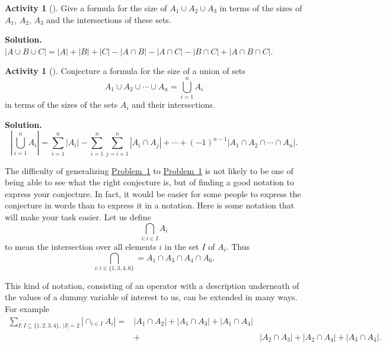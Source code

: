 \documentclass[10pt,]{book}
\theoremstyle{plain}
\theoremstyle{definition}
\newtheorem{activity}[project]{Activity}
\numberwithin{equation}{chapter}
\newcommand{\amp}{&}
\begin{document}
\begin{activity}[]\label{threesetintersection}
Give a formula for the size of \(A_1\cup A_2\cup A_3\) in terms of the sizes of \(A_1\), \(A_2\), \(A_3\) and the intersections of these sets.%
\par\medskip\noindent%
\textbf{Solution.}\quad \(|A\cup B\cup C|=|A|+|B|+|C|-|A\cap B|- |A\cap C| - |B\cap
C| +|A\cap B\cap C|\).%
\end{activity}
\begin{activity}[]\label{nsetintersection}
Conjecture a formula for the size of a union of sets%
\begin{equation*}
A_1\cup
A_2\cup \cdots\cup A_n = \bigcup_{i=1}^n A_i
\end{equation*}
in terms of the sizes of the sets \(A_i\) and their intersections.%
\par\medskip\noindent%
\textbf{Solution.}\quad %
\begin{equation*}
\left|\bigcup_{i=1}^n A_i\right| = \sum_{i=1}^n|A_i| -
\sum_{i=1}^n\sum_{j=i+1}^n |A_i \cap A_j| + \cdots +(-1)^{n-1} |A_1\cap
A_2\cap\cdots \cap A_n|.
\end{equation*}
\end{activity}
The difficulty of generalizing \hyperref[threesetintersection]{Problem~\ref{threesetintersection}} to \hyperref[nsetintersection]{Problem~\ref{nsetintersection}} is not likely to be one of being able to see what the right conjecture is, but of finding a good notation to express your conjecture. In fact, it would be easier for some people to express the conjecture in words than to express it in a notation. Here is some notation that will make your task easier. Let us define%
\begin{equation*}
\bigcap_{i:i\in I}A_i
\end{equation*}
to mean the intersection over all elements \(i\) in the set \(I\) of \(A_i\). Thus%
\begin{equation}
\bigcap_{i:i\in
\{1,3,4,6\}} = A_1\cap A_3\cap A_4 \cap A_6.\label{intersectionnotation}
\end{equation}
%
\par
This kind of notation, consisting of an operator with a description underneath of the values of a dummy variable of interest to us, can be extended in many ways. For example%
\begin{align*}
\sum_{I:I \subseteq \{1,2,3,4\}, \ |I|=2} |\cap_{i\in I}
A_i|  =\amp  |A_1\cap A_2|+ |A_1\cap A_3|
+|A_1\cap A_4|\nonumber\\
\amp +\amp  |A_2\cap A_3|+
|A_2\cap A_4| +|A_3\cap A_4|.
\end{align*}
\end{document}
